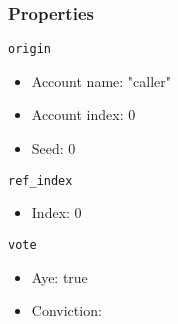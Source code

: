 \documentclass[11pt,a4paper]{article}
\begin{document}
\subsubsection*{Properties}
\verb|origin|
\begin{itemize}
    \item Account name: "caller"
    \item Account index: 0 
    \item Seed: 0
\end{itemize}
\verb|ref_index|
\begin{itemize}
    \item Index: 0
\end{itemize}
\verb|vote|
\begin{itemize}
    \item Aye: true
    \item Conviction: 
\end{itemize}
\end{document}
